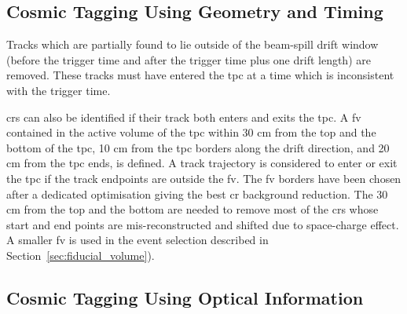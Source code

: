 \subsection[Cosmic Tagging: Geometry]{Cosmic Tagging Using Geometry and Timing}

Tracks which are partially found to lie outside of the beam-spill drift window (before the trigger time and after the trigger time plus one drift length) are removed. These tracks must have entered the \acrshort{tpc} at a time which is inconsistent with the trigger time.

\acrshort{cr}s can also be identified  if their track both enters and exits the \acrshort{tpc}. 
A \acrfull{fv} contained in the active volume of the \acrshort{tpc} within 30 cm from the top and the bottom of the \acrshort{tpc}, 10 cm from the \acrshort{tpc} borders along the drift direction, and 20 cm from the \acrshort{tpc} ends, is defined.
A track trajectory is considered to enter or exit the \acrshort{tpc} if the track endpoints are outside the \acrshort{fv}. 
The \acrshort{fv} borders have been chosen after a dedicated optimisation giving the best \acrshort{cr} background reduction. The 30 cm from the top and the bottom are needed to remove most of the \acrshort{cr}s whose start and end points are mis-reconstructed and shifted due to space-charge effect. A smaller \acrshort{fv} is used in the event selection described in Section~\ref{sec:fiducial_volume}). 






\subsection[Cosmic Tagging: Optical]{Cosmic Tagging Using Optical Information}
\label{sec:ct_optical}

